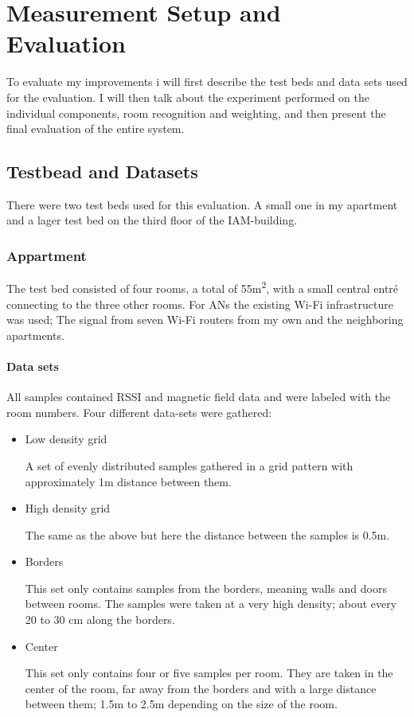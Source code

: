\chapter{Measurement Setup and Evaluation}

\label{Chapter4}

To evaluate my improvements i will first describe the test beds and data sets used for the evaluation. I will then talk about the experiment performed on the individual components, room recognition and weighting, and then present the final evaluation of the entire system.

\section{Testbead and Datasets}

There were two test beds used for this evaluation. A small one in my apartment and a lager test bed on the third floor of the IAM-building.

\subsection{Appartment}
The test bed consisted of four rooms, a total of 55m\textsuperscript{2}, with a small central entré connecting to the three other rooms. For ANs the existing Wi-Fi infrastructure was used; The signal from seven Wi-Fi routers from my own and the neighboring apartments. 

\subsubsection{Data sets}
All samples contained RSSI and magnetic field data and were labeled with the room numbers. Four different data-sets were gathered:
\begin{itemize}
\item Low density grid

A set of evenly distributed samples gathered in a grid pattern with approximately 1m distance between them.

\item High density grid

The same as the above but here the distance between the samples is 0.5m.
\item Borders

This set only contains samples from the borders, meaning walls and doors between rooms. The samples were taken at a very high density; about every 20 to 30 cm along the borders.
\item Center

This set only contains four or five samples per room. They are taken in the center of the room, far away from the borders and with a large distance between them; 1.5m to 2.5m depending on the size of the room.
\end{itemize}


